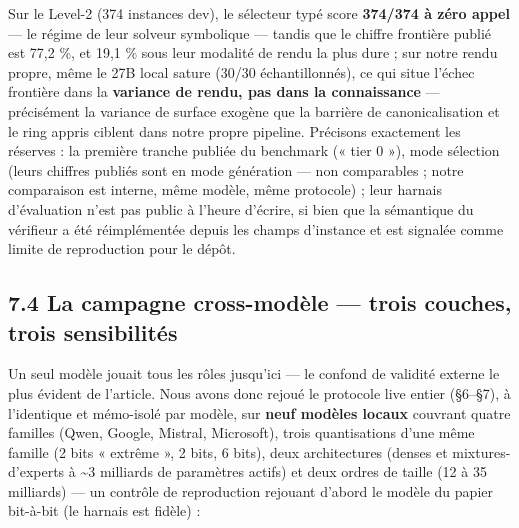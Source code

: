 \documentclass[11pt]{article}
\begin{document}
Sur le Level-2 (374 instances dev), le sélecteur typé score \textbf{374/374 à zéro appel} — le régime de leur solveur symbolique — tandis que le chiffre frontière publié est 77,2 \%, et 19,1 \% sous leur modalité de rendu la plus dure ; sur notre rendu propre, même le 27B local sature (30/30 échantillonnés), ce qui situe l'échec frontière dans la \textbf{variance de rendu, pas dans la connaissance} — précisément la variance de surface exogène que la barrière de canonicalisation et le ring appris ciblent dans notre propre pipeline. Précisons exactement les réserves : la première tranche publiée du benchmark (« tier 0 »), mode sélection (leurs chiffres publiés sont en mode génération — non comparables ; notre comparaison est interne, même modèle, même protocole) ; leur harnais d'évaluation n'est pas public à l'heure d'écrire, si bien que la sémantique du vérifieur a été réimplémentée depuis les champs d'instance et est signalée comme limite de reproduction pour le dépôt.

\subsection*{7.4 La campagne cross-modèle — trois couches, trois sensibilités}

Un seul modèle jouait tous les rôles jusqu'ici — le confond de validité externe le plus évident de l'article. Nous avons donc rejoué le protocole live entier (§6–§7), à l'identique et mémo-isolé par modèle, sur \textbf{neuf modèles locaux} couvrant quatre familles (Qwen, Google, Mistral, Microsoft), trois quantisations d'une même famille (2 bits « extrême », 2 bits, 6 bits), deux architectures (denses et mixtures-d'experts à \textasciitilde{}3 milliards de paramètres actifs) et deux ordres de taille (12 à 35 milliards) — un contrôle de reproduction rejouant d'abord le modèle du papier bit-à-bit (le harnais est fidèle) :
\end{document}
